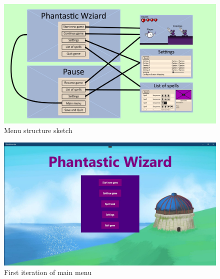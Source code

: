 \documentclass[12pt]{article}
\begin{document}
\begin{figure}[H]
    \centering
    \includegraphics[max width=\textwidth]{images/menu_structure.jpg}
    \caption{Menu structure sketch}
\end{figure}

\begin{figure}[H]
    \centering
    \includegraphics[max width=\textwidth]{images/013.JPG}
    \caption{First iteration of main menu}
\end{figure}
\end{document}
